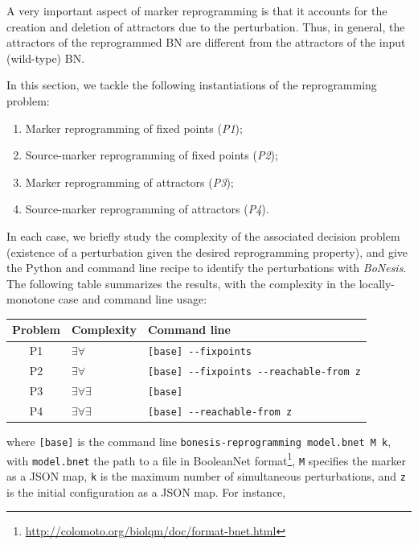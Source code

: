 \documentclass[PCJ,Unicode,screen,mode=plain]{cedram}
\begin{document}
A very important aspect of marker reprogramming is that it accounts for
the creation and deletion of attractors due to the perturbation. Thus,
in general, the attractors of the reprogrammed BN are different from the
attractors of the input (wild-type) BN.

In this section, we tackle the following instantiations of the
reprogramming problem:

\begin{enumerate}
\def\labelenumi{\arabic{enumi}.}
\item
  Marker reprogramming of fixed points (\emph{P1});
\item
  Source-marker reprogramming of fixed points (\emph{P2});
\item
  Marker reprogramming of attractors (\emph{P3});
\item
  Source-marker reprogramming of attractors (\emph{P4}).
\end{enumerate}

In each case, we briefly study the complexity of the associated decision
problem (existence of a perturbation given the desired reprogramming
property), and give the Python and command line recipe to identify the
perturbations with \emph{BoNesis}. The following table summarizes the
results, with the complexity in the locally-monotone case and command
line usage:

\begin{longtable}[]{@{}cll@{}}
\toprule()
Problem & Complexity & Command line \\
\midrule()
\endhead
P1 & \(\exists\forall\) & \texttt{{[}base{]}\ -\/-fixpoints} \\
P2 & \(\exists\forall\) &
\texttt{{[}base{]}\ -\/-fixpoints\ -\/-reachable-from\ z} \\
P3 & \(\exists\forall\exists\) & \texttt{{[}base{]}} \\
P4 & \(\exists\forall\exists\) &
\texttt{{[}base{]}\ -\/-reachable-from\ z} \\
\bottomrule()
\end{longtable}

where \texttt{{[}base{]}} is the command line
\texttt{bonesis-reprogramming\ model.bnet\ M\ k}, with
\texttt{model.bnet} the path to a file in
BooleanNet
format\footnote{\url{http://colomoto.org/biolqm/doc/format-bnet.html}}, \texttt{M} specifies the marker as a JSON map, \texttt{k} is
the maximum number of simultaneous perturbations, and \texttt{z} is the
initial configuration as a JSON map. For instance,
\end{document}
